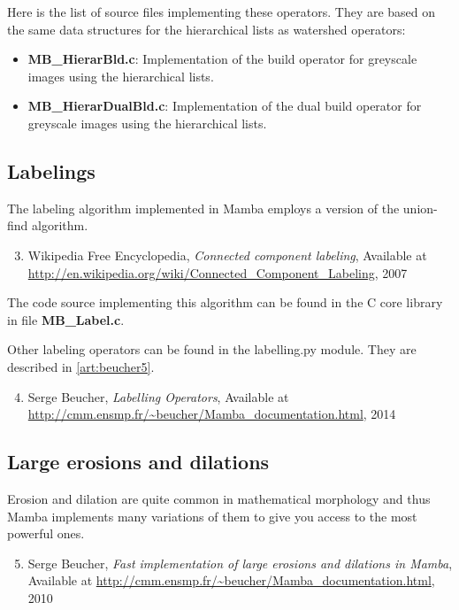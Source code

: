 \documentclass[a4paper,10pt,oneside]{article}
\begin{document}
Here is the list of source files implementing these operators. They are based on
the same data structures for the hierarchical lists as watershed operators:

\begin{itemize}
\item \textbf{MB\_HierarBld.c}: Implementation of the build operator for
greyscale images using the hierarchical lists.
\item \textbf{MB\_HierarDualBld.c}: Implementation of the dual build operator
for greyscale images using the hierarchical lists.
\end{itemize}

\subsection{Labelings}

The labeling algorithm implemented in Mamba employs a version of the union-find 
algorithm.

\begin{enumerate}
\setcounter{enumi}{2}
\item \label{art:wikipedia} Wikipedia Free Encyclopedia, 
\emph{Connected component labeling},
Available at \url{http://en.wikipedia.org/wiki/Connected\_Component\_Labeling}, 2007
\end{enumerate}

The code source implementing this algorithm can be found in the C core library
in file \textbf{MB\_Label.c}.

Other labeling operators can be found in the labelling.py module. They are described in \ref{art:beucher5}.

\begin{enumerate}
\setcounter{enumi}{3}
\item \label{art:beucher5} Serge Beucher,
\emph{Labelling Operators},
Available at \url{http://cmm.ensmp.fr/\~beucher/Mamba\_documentation.html}, 2014
\end{enumerate}

\subsection{Large erosions and dilations}
\label{cha:opt_ero_dil}

Erosion and dilation are quite common in mathematical morphology and thus Mamba
implements many variations of them to give you access to the most powerful ones.

\begin{enumerate}
\setcounter{enumi}{4}
\item \label{art:beucher1} Serge Beucher,
\emph{Fast implementation of large erosions and dilations in Mamba},
Available at \url{http://cmm.ensmp.fr/\~beucher/Mamba\_documentation.html}, 2010
\end{enumerate}
\end{document}
